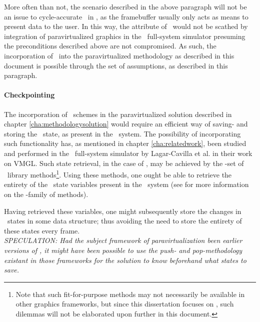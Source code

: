 \noindent
More often than not, the scenario described in the above paragraph will not be an issue to cycle-accurate \dvttermdeterministicexecution\ in \dvttermsimics , as the framebuffer usually only acts as means to present data to the user.
In this way, the attribute of \dvttermdeterministicexecution\ would not be scathed by integration of paravirtualized graphics in the \dvttermsimics\ full-system simulator presuming the preconditions described above are not compromised.
As such, the incorporation of \dvttermdeterministicexecution\ into the paravirtualized methodology as described in this document is possible through the set of assumptions, as described in this paragraph.

\paragraph{Checkpointing}
\label{par:futurework_simicsproductification_checkpointing}
The incorporation of \dvttermcheckpointrestart\ schemes in the paravirtualized solution described in chapter \ref{cha:methodologysolution} would require an efficient way of saving- and storing the \dvttermopengl\ state, as present in the \dvttermhost\ system.
The possibility of incorporating such functionality has, as mentioned in chapter \ref{cha:relatedwork}, been studied and performed in the \dvttermqemu\ full-system simulator by Lagar-Cavilla et al. in their work on VMGL.
Such state retrieval, in the case of \dvttermopenglestwopointo , may be achieved by the -set of \dvttermopengl\ library methods\footnote{Note that such fit-for-purpose methods may not necessarily be available in other graphics frameworks, but since this dissertation focuses on \dvttermopenglestwopointo , such dilemmas will not be elaborated upon further in this document.}.
Using these methods, one ought be able to retrieve the entirety of the \dvttermopengl\ state variables present in the \dvttermhost\ system (see  for more information on the -family of methods).

Having retrieved these variables, one might subsequently store the changes in \dvttermopengl\ states in some data structure; thus avoiding the need to store the entirety of these states every frame.\\

\textit{SPECULATION: Had the subject framework of paravirtualization been earlier versions of \dvttermopengl , it might have been possible to use the push- and pop-methodology existant in those frameworks for the solution to know beforehand what states to save.}

